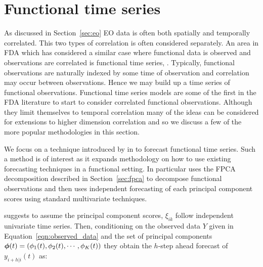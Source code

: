 \section{Functional time series\label{sec:fts}}
As discussed in Section~\ref{sec:eo} EO data is often both spatially and temporally correlated.
This two types of correlation is often considered separately. 
An area in FDA which has considered a similar case where functional data is observed and observations are correlated is functional time series, \citep{aguilera_forecasting_1999}. Typically, functional observations are naturally indexed by some time of observation and correlation may occur between observations. Hence we may build up a time series of functional observations. Functional time series models are some of the first in the FDA literature to start to consider correlated functional observations.
Although they limit themselves to temporal correlation many of the ideas can be considered for extensions to higher dimension correlation and so we discuss a few of the more popular methodologies in this section.

We focus on a technique introduced by \citeauthor{hyndman_forecasting_2009} in \citep{hyndman_forecasting_2009} to forecast functional time series.
Such a method is of interest as it expands methodology on how to use existing forecasting techniques in a functional setting.
In particular \citep{hyndman_forecasting_2009} uses the FPCA decomposition described in Section~\ref{sec:fpca} to decompose functional observations and then uses independent forecasting of each principal component scores using standard multivariate techniques.

\citep{hyndman_robust_2007} suggests to assume the principal component scores, $\xi_{ik}$ follow independent univariate time series. Then, conditioning on the observed data $Y$ given in Equation~\eqref{eqn:observed_data} and the set of principal components $\bm{{\phi}}(t) = \left(\phi_1(t), \phi_2(t), \cdots, \phi_K(t)\right)$ they obtain the $h$-step ahead forecast of $y_{i+h | i}(t)$ as:

